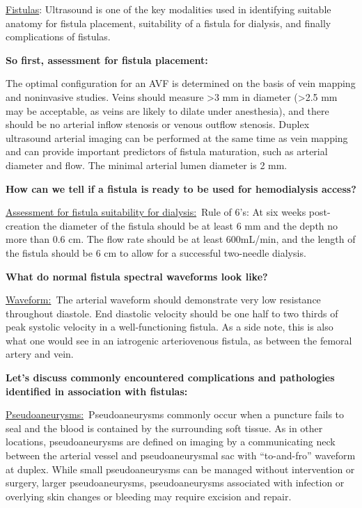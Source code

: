\documentclass[
]{book}
\begin{document}
\underline{Fistulas}: Ultrasound is one of the key modalities used in
identifying suitable anatomy for fistula placement, suitability of a
fistula for dialysis, and finally complications of fistulas.

\textbf{So first, assessment for fistula placement:}

The optimal configuration for an AVF is determined on the basis of vein
mapping and noninvasive studies. Veins should measure \textgreater3 mm in diameter
(\textgreater2.5 mm may be acceptable, as veins are likely to dilate under
anesthesia), and there should be no arterial inflow stenosis or venous
outflow stenosis. Duplex ultrasound arterial imaging can be performed at
the same time as vein mapping and can provide important predictors of
fistula maturation, such as arterial diameter and flow. The minimal
arterial lumen diameter is 2 mm.

\textbf{How can we tell if a fistula is ready to be used for hemodialysis
access?}

\underline{Assessment for fistula suitability for dialysis:}~Rule of 6's: At
six weeks post-creation the diameter of the fistula should be at least 6
mm and the depth no more than 0.6 cm. The flow rate should be at least
600mL/min, and the length of the fistula should be 6 cm to allow for a
successful two-needle dialysis.

\textbf{What do normal fistula spectral waveforms look like?}

\underline{Waveform:}~The arterial waveform should demonstrate very low
resistance throughout diastole. End diastolic velocity should be one
half to two thirds of peak systolic velocity in a well-functioning
fistula. As a side note, this is also what one would see in an
iatrogenic arteriovenous fistula, as between the femoral artery and
vein.

\textbf{Let's discuss commonly encountered complications and pathologies
identified in association with fistulas:}

\underline{Pseudoaneurysms:}~Pseudoaneurysms commonly occur when a puncture
fails to seal and the blood is contained by the surrounding soft tissue.
As in other locations, pseudoaneurysms are defined on imaging by a
communicating neck between the arterial vessel and pseudoaneurysmal sac
with ``to-and-fro'' waveform at duplex. While small pseudoaneurysms can be
managed without intervention or surgery, larger pseudoaneurysms,
pseudoaneurysms associated with infection or overlying skin changes or
bleeding may require excision and repair.
\end{document}
